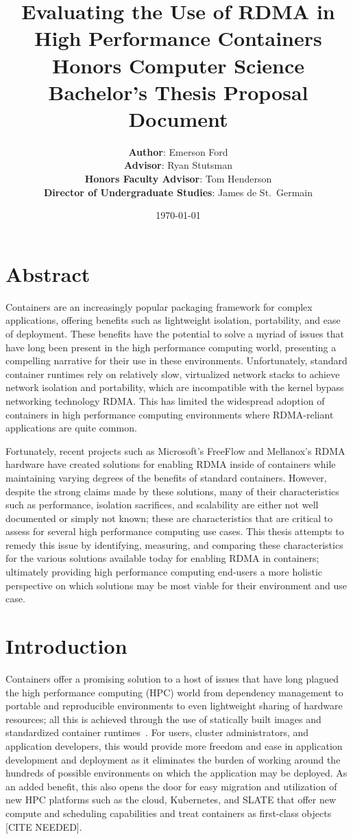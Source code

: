 \documentclass[12pt,titlepage]{article}
\title{\Large\textbf{Evaluating the Use of RDMA in High Performance Containers} \\
Honors Computer Science Bachelor's Thesis Proposal Document}
\author{\textbf{Author}: Emerson Ford \\
\textbf{Advisor}: Ryan Stutsman \\
\textbf{Honors Faculty Advisor}: Tom Henderson \\
\textbf{Director of Undergraduate Studies}: James de St.\ Germain }
\date{\today}
\begin{document}
\maketitle

\section*{Abstract}
Containers are an increasingly popular packaging framework for complex applications, offering benefits such as lightweight isolation, portability, and ease of deployment.
These benefits have the potential to solve a myriad of issues that have long been present in the high performance computing world, presenting a compelling narrative for their use in these environments.
Unfortunately, standard container runtimes rely on relatively slow, virtualized network stacks to achieve network isolation and portability, which are incompatible with the kernel bypass networking technology RDMA\@.
This has limited the widespread adoption of containers in high performance computing environments where RDMA-reliant applications are quite common.

Fortunately, recent projects such as Microsoft's FreeFlow and Mellanox's RDMA hardware have created solutions for enabling RDMA inside of containers while maintaining varying degrees of the benefits of standard containers.
However, despite the strong claims made by these solutions, many of their characteristics such as performance, isolation sacrifices, and scalability are either not well documented or simply not known; these are characteristics that are critical to assess for several high performance computing use cases.
This thesis attempts to remedy this issue by identifying, measuring, and comparing these characteristics for the various solutions available today for enabling RDMA in containers;
ultimately providing high performance computing end-users a more holistic perspective on which solutions may be most viable for their environment and use case.

\section{Introduction}
Containers offer a promising solution to a host of issues that have long plagued the high performance computing (HPC) world from dependency management to portable and reproducible environments to even lightweight sharing of hardware resources;
all this is achieved through the use of statically built images and standardized container runtimes~\cite{containershpc}.
For users, cluster administrators, and application developers, this would provide more freedom and ease in application development and deployment as it eliminates the burden of working around the hundreds of possible environments on which the application may be deployed.
As an added benefit, this also opens the door for easy migration and utilization of new HPC platforms such as the cloud, Kubernetes, and SLATE that offer new compute and scheduling capabilities and treat containers as first-class objects [CITE NEEDED].
\end{document}
